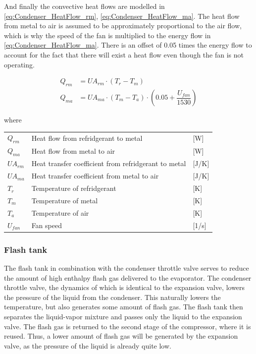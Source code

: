 And finally the convective heat flows are modelled in \cref{eq:Condenser_HeatFlow_rm}, \cref{eq:Condenser_HeatFlow_ma}. The heat flow from metal to air is assumed to be approximately proportional to the air flow, which is why the speed of the fan is multiplied to the energy flow in \cref{eq:Condenser_HeatFlow_ma}. There is an offset of 0.05 times the energy flow to account for the fact that there will exist a heat flow even though the fan is not operating.

\begin{align}
	Q_{rm}	 			& = U A_{rm} \cdot (T_r - T_m)							\label{eq:Condenser_HeatFlow_rm}\\
	Q_{ma}	 			& = U A_{ma} \cdot (T_m - T_a)\cdot (0.05 + \dfrac{U_{fan}}{1530})				\label{eq:Condenser_HeatFlow_ma}
\end{align}

where

\begin{center}
	\begin{tabular}{l p{8cm} l}
		$Q_{rm}$				&	Heat flow from refridgerant to metal					& [\si{W}] \\
		$Q_{ma}$				&	Heat flow from metal to air								& [\si{W}] \\
		$U A_{rm}$				& 	Heat transfer coefficient from refridgerant to metal 	& [\si{J}/\si{K}] \\
		$U A_{ma}$				& 	Heat transfer coefficient from metal to air				& [\si{J}/\si{K}] \\
		$T_r$					& 	Temperature of refridgerant 							& [\si{K}] \\
		$T_m$					&	Temperature of metal 									& [\si{K}] \\
		$T_a$					&	Temperature of air 										& [\si{K}] \\
		$U_{fan}$				&	Fan speed												& [1/\si{s}] \\
	\end{tabular}
\end{center}



\subsubsection{Flash tank}
The flash tank in combination with the condenser throttle valve serves to reduce the amount of high enthalpy flash gas delivered to the evaporator. The condenser throttle valve, the dynamics of which is identical to the expansion valve, lowers the pressure of the liquid from the condenser. This naturally lowers the temperature, but also generates some amount of flash gas. The flash tank then separates the liquid-vapor mixture and passes only the liquid to the expansion valve. The flash gas is returned to the second stage of the compressor, where it is reused. Thus, a lower amount of flash gas will be generated by the expansion valve, as the pressure of the liquid is already quite low.

